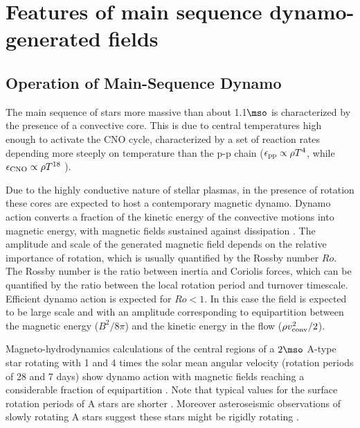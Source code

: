 \section{Features of main sequence dynamo-generated fields}

\subsection{Operation of Main-Sequence Dynamo}

The main sequence of stars more massive than about 1.1$\mso$ is characterized by the presence of a convective core.
This is due to central temperatures high enough to activate the CNO cycle, characterized by a set of reaction rates depending more steeply on temperature than the p-p chain ($\epsilon_{\rm pp}\propto \rho T^{4}$, while $\epsilon_{\rm CNO}\propto \rho T^{18}$ ).

Due to the highly conductive nature of stellar plasmas, in the presence of rotation
these cores are expected to host a contemporary magnetic dynamo. Dynamo action converts a fraction of the kinetic energy 
of the convective motions into magnetic energy, with magnetic fields sustained against dissipation  \citep[see e.g.,][]{Brandenburg_2005}. The amplitude and scale of the generated magnetic field depends on the relative importance of rotation, which is usually quantified by the Rossby number $Ro$. The Rossby number is the ratio between inertia and Coriolis forces, which can be quantified by the ratio between the local rotation period and turnover timescale. 
Efficient dynamo action is expected for $Ro<1$. In this case the field is expected to be large scale and with an amplitude corresponding to equipartition between the magnetic energy ($B^2/8\pi$) and the kinetic energy in the flow ($\rho v^2_{\rm conv}/2$). 

Magneto-hydrodynamics calculations of the central regions of a $2\mso$ A-type star rotating with 
1 and 4 times the solar mean angular velocity (rotation periods of 28 and 7 days) show dynamo action 
with magnetic fields reaching a considerable fraction of equipartition \citep{Brun_2005}. Note that typical values for the surface  rotation periods of A stars are shorter \citep[about 1 day, see e.g.][]{Zorec_2012}. Moreover asteroseismic observations of slowly rotating A stars suggest these stars might be rigidly rotating \cite{Kurtz_2014}.

